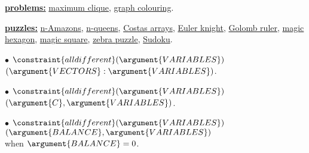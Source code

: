 \begin{ctrdesc}
\hyperlink{problems}{{\bf problems:}}
\hyperlink{maximum_clique}{maximum clique},
\hyperlink{graph_colouring}{graph colouring}.
 
\hyperlink{puzzles}{{\bf puzzles:}}
\hyperlink{n-Amazons}{n-Amazons},
\hyperlink{n-queens}{n-queens},
\hyperlink{Costas_arrays}{Costas arrays},
\hyperlink{Euler_knight}{Euler knight},
\hyperlink{Golomb_ruler}{Golomb ruler},
\hyperlink{magic_hexagon}{magic hexagon},
\hyperlink{magic_square}{magic square},
\hyperlink{zebra_puzzle}{zebra puzzle},
\hyperlink{Sudoku}{Sudoku}.
 
\item[\pdfmarkup{subject={Cond. implications},color=white,markup=Highlight}{Cond. implications}{Conditional implications.}]
\vspace{0.1pt}
\begin{minipage}[t]{11.2cm}
$\bullet$ $\constraint{alldifferent}(\argument{VARIABLES})$\\
\hspace*{7pt}{\bf implies}\hspace*{1pt} $ $\hyperlink{Clex_alldifferent}{}$(\argument{VECTORS}:\argument{VARIABLES})$.
\end{minipage}
\vspace{0.16cm}

 \begin{minipage}[t]{11.2cm}
$\bullet$ $\constraint{alldifferent}(\argument{VARIABLES})$\\
\hspace*{7pt}{\bf implies}\hspace*{1pt} $ $\hyperlink{Csoft_alldifferent_ctr}{}$(\argument{C},\argument{VARIABLES})$.
\end{minipage}
\vspace{0.16cm}

 \begin{minipage}[t]{11.2cm}
$\bullet$ $\constraint{alldifferent}(\argument{VARIABLES})$\\
\hspace*{7pt}{\bf implies}\hspace*{1pt} $ $\hyperlink{Cbalance}{}$(\argument{BALANCE},\argument{VARIABLES})$\\
 \hspace*{10pt} when\hspace*{3pt} $\argument{BALANCE}=0$.
\end{minipage}
\vspace{0.16cm}


\end{ctrdesc}

